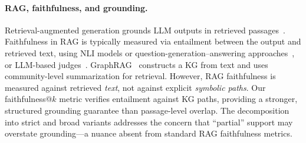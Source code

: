 \paragraph{RAG, faithfulness, and grounding.}
Retrieval-augmented generation grounds LLM outputs in retrieved passages~\cite{brown2025systematic,neha2025retrievalaugmented}. Faithfulness in RAG is typically measured via entailment between the output and retrieved text, using NLI models or question-generation--answering approaches~\cite{honovich2021evaluating}, or LLM-based judges~\cite{min2023factscore}. GraphRAG~\cite{han2024graphrag} constructs a KG from text and uses community-level summarization for retrieval. However, RAG faithfulness is measured against retrieved \emph{text}, not against explicit \emph{symbolic paths}. Our faithfulness@$k$ metric verifies entailment against KG paths, providing a stronger, structured grounding guarantee than passage-level overlap. The decomposition into strict and broad variants addresses the concern that ``partial'' support may overstate grounding---a nuance absent from standard RAG faithfulness metrics.
